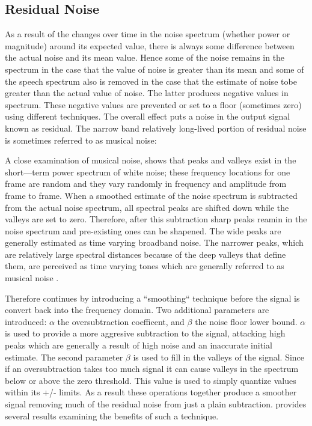 \subsection{Residual Noise}

As a result of the changes over time in the noise spectrum (whether power or magnitude) around its expected value, there is always some difference between the actual noise and its mean value. Hence some of the noise remains in the spectrum in the case that the value of noise is greater than its mean and some of the speech spectrum also is removed in the case that the estimate of noise tobe greater than the actual value of noise. The latter produces negative values in spectrum. These negative values are prevented or set to a floor (sometimes zero) using different techniques. The overall effect puts a noise in the output signal known as residual. The narrow band relatively long-lived portion of residual noise is sometimes referred to as musical noise:

A close examination of musical noise, shows that peaks and valleys exist in the short—term power spectrum of white noise; these frequency locations for one frame are random and they vary randomly in frequency and amplitude from frame to frame. When a smoothed estimate of the noise spectrum is subtracted from the actual noise spectrum, all spectral peaks are shifted down while the valleys are set to zero. Therefore, after this subtraction sharp peaks reamin in the noise spectrum and pre-existing ones can be shapened. The wide peaks are generally estimated as time varying broadband noise. The narrower peaks, which are relatively large spectral distances because of the deep valleys that define them, are perceived as time varying tones which are generally referred to as musical noise \cite{berouti}.

Therefore \cite{boll} continues by introducing a ``smoothing`` technique before the signal is convert back into the frequency domain.  Two additional parameters are introduced: \( \alpha \) the oversubtraction coefficent, and \(\beta\) the noise floor lower bound.  \(\alpha\) is used to provide a more aggresive subtraction to the signal, attacking high peaks which are generally a result of high noise and an inaccurate initial estimate.  The second parameter \(\beta\) is used to fill in the valleys of the signal.  Since if an oversubtraction takes too much signal it can cause valleys in the spectrum below or above the zero threshold.  This value is used to simply quantize values within its +/- limits.  As a result these operations together produce a smoother signal removing much of the residual noise from just a plain subtraction.  \cite{boll} provides several results examining the benefits of such a technique.\\  


